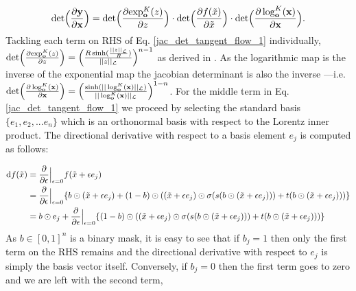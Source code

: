 \begin{equation}
    \textnormal{det}\Big (\frac{\partial \textbf{y}}{\partial \textbf{x}}\Big) =  \textnormal{det}\Big (\frac{\partial \textnormal{exp}^K_{\textbf{o}}(z)}{\partial z}\Big) \cdot \textnormal{det}\Big (\frac{\partial f(\tilde{x})}{\partial \tilde{x}}\Big) \cdot  \textnormal{det}\Big (\frac{\partial \log^K_{\textbf{o}}(\textbf{x})}{\partial \textbf{x}}\Big)
    \label{jac_det_tangent_flow_1}.
\end{equation}
Tackling each term on RHS of Eq. \ref{jac_det_tangent_flow_1} individually, $ \textnormal{det}\Big (\frac{\partial \textnormal{exp}^K_{\textbf{o}}(z)}{\partial z}\Big) = \Big(\frac{R\sinh(\frac{||z||_{\mathcal{L}}}{R})}{||z||_{\mathcal{L}}}\Big)^{n-1}$ as derived in \cite{nagano2019wrapped}. As the logarithmic map is the inverse of the exponential map the jacobian determinant is also the inverse ---i.e.  $\textnormal{det}\Big (\frac{\partial \log^K_{\textbf{o}}(\textbf{x})}{\partial \textbf{x}}\Big) = \Big(\frac{\sinh(||\log^K_{\textbf{o}}(\textbf{x})||_{\mathcal{L}})}{||\log^K_{\textbf{o}}(\textbf{x})||_{\mathcal{L}}}\Big)^{1-n}$. For the middle term in Eq. \ref{jac_det_tangent_flow_1} we proceed by selecting the standard basis $\{e_1, e_2, ... e_n\}$ which is an orthonormal basis  with respect to the Lorentz inner product. The directional derivative with respect to a basis element $e_j$ is computed as follows:

\begin{align*}
    \textnormal{d}f(\tilde{x}) &= \frac{\partial}{\partial \epsilon} \Big |_{\epsilon=0} f(\tilde{x} + \epsilon e_j)\\
    & = \frac{\partial}{\partial \epsilon} \Big |_{\epsilon=0} \{b \odot (\tilde{x} + \epsilon e_j) + (1 - b)\odot((\tilde{x} + \epsilon e_j) \odot \sigma(s(b \odot (\tilde{x} + \epsilon e_j))) + t(b \odot (\tilde{x} + \epsilon e_j)))\} \\
    &= b \odot  e_j + \frac{\partial}{\partial \epsilon} \Big |_{\epsilon=0}\{ (1 - b)\odot((\tilde{x} + \epsilon e_j) \odot \sigma(s(b \odot (\tilde{x} + \epsilon e_j))) + t(b \odot (\tilde{x} + \epsilon e_j)))\} \\
\end{align*}
As $b \in [0,1]^n$ is a binary mask, it is easy to see that if $b_j =1$ then only the first term on the RHS remains and the directional derivative with respect to $e_j$ is simply the basis vector itself. Conversely, if $b_j =0$ then the first term goes to zero and we are left with the second term,

